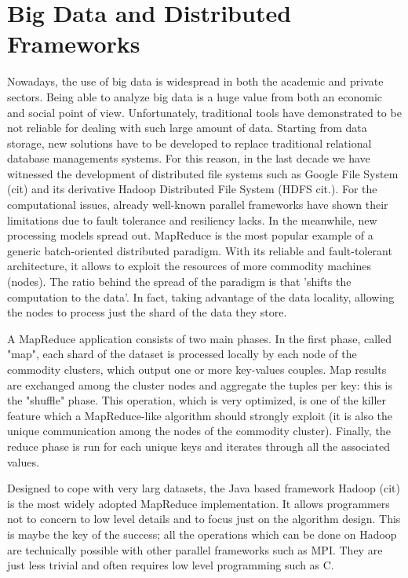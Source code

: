 \section{Big Data and Distributed Frameworks}
Nowadays, the use of big data is widespread in both the academic and private sectors. Being able to analyze big data is a huge value from both an economic and social point of view. Unfortunately, traditional tools have demonstrated to be not reliable for dealing with such large amount of data.
Starting from data storage, new solutions have to be developed to replace traditional relational database managements systems. For this reason, in the last decade we have witnessed the development of distributed file systems such as Google File System (cit) and its derivative Hadoop Distributed File System (HDFS cit.). For the computational issues, already well-known parallel frameworks have shown their limitations due to fault tolerance and resiliency lacks. In the meanwhile, new processing models spread out. 
MapReduce is the most popular example of a generic batch-oriented distributed paradigm. With its reliable and fault-tolerant architecture, it allows to exploit the resources of more commodity machines (nodes). The ratio behind the spread of the paradigm is that 'shifts the computation to the data'.
In fact, taking advantage of the data locality, allowing the nodes to process just the shard of the data they store.

A MapReduce application consists of two main phases. In the first phase, called "map", each shard of the dataset is processed locally by each node of the commodity clusters, which output one or more key-values couples. Map results are exchanged among the cluster nodes and aggregate the tuples per key: this is the "shuffle" phase. This operation, which is very optimized, is one of the killer feature which a MapReduce-like algorithm should strongly exploit (it is also the unique communication among the nodes of the commodity cluster). Finally, the reduce phase is run for each unique keys and iterates through all the associated values.

Designed to cope with very larg datasets, the Java based framework Hadoop (cit) is the most widely adopted MapReduce implementation. It allows programmers not to concern to low level details and to focus just on the algorithm design. This is maybe the key of the success; all the operations which can be done on Hadoop are technically possible with other parallel frameworks such as MPI. They are just less trivial and often requires low level programming such as C.

